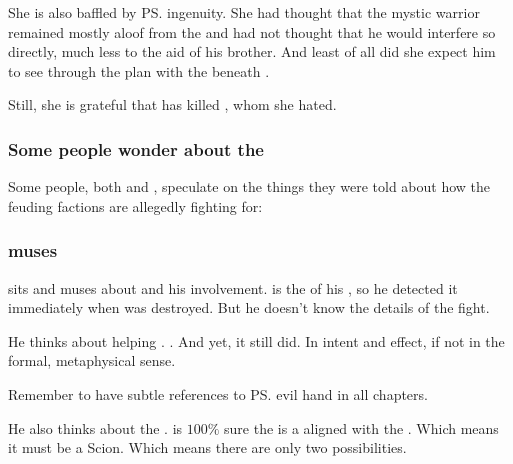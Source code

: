She is also baffled by \ps{\Ishnaruchaefir} ingenuity. She had thought that the mystic warrior remained mostly aloof from the \secretwar{} and had not thought that he would interfere so directly, much less to the aid of his brother. And least of all did she expect him to see through the plan with the \noggyaleth{} beneath \Malcur. 


Still, she is grateful that \Ishnaruchaefir{} has killed \Teshrial, whom she hated. 





\subsubsection{Some people wonder about the }
Some people, both \human{} and \scathaese{}, speculate on the things they were told about how the feuding factions are allegedly fighting for: 





\subsubsection{\Azraid{} muses}
\Azraid{} sits and muses about \Ishnaruchaefir{} and his involvement. 
\Azraid{} is the \apex{} of his \matrix, so he detected it immediately when \Teshrial{} was destroyed. 
But he doesn't know the details of the fight. 

He thinks about \Ishnaruchaefir{} helping \Secherdamon. 
. 
And yet, it still did. 
In intent and effect, if not in the formal, metaphysical sense. 

Remember to have subtle references to \ps{\Azraid} evil hand in all \Azraid{} chapters. 

\begin{prose}
\end{prose}

He also thinks about the \vertexspike{}. 
\Achsah{} is $100\%$ sure the \vertex{} is a \sathariah{} aligned with the . 
Which means it must be a Scion. 
Which means there are only two possibilities. 

